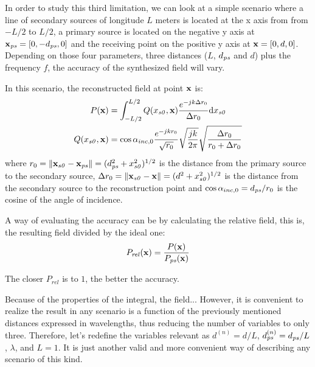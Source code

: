 In order to study this third limitation, we can look at a simple scenario where a line of secondary sources of longitude $L$ meters is located at the x axis from from $-L/2$ to $L/2$, a primary source is located on the negative y axis at $\PosTheo[primarySource] = [0, -d_{\PosTheoSubInd[primarySource]}, 0]$ and the receiving point on the positive y axis at $\PosTheo = [0, d, 0]$. Depending on those four parameters, three distances ($L$, $d_{\PosTheoSubInd[primarySource]}$ and $d$) plus the frequency $f$, the accuracy of the synthesized field will vary.

In this scenario, the reconstructed field at point $\PosTheo$ is:
\begin{equation}
\begin{aligned}
P(\PosTheo) &= \int_{-L/2}^{L/2} Q(x_{\PosTheoSubInd[section]}, \PosTheo) \frac{e^{-jk\distLinePoint}}{\distLinePoint} \mathrm{d}x_{\PosTheoSubInd[section]}\\
Q(x_{\PosTheoSubInd[section]}, \PosTheo) &= \cos\normPrimaryPropAngleSection \frac{e^{-jk\distLinePrimSource}}{\sqrt{\distLinePrimSource}} \sqrt{\frac{j k}{2\pi}} \sqrt{\frac{\distLinePoint}{\distLinePrimSource + \distLinePoint}}
\end{aligned}
\end{equation}
where $\distLinePrimSource = \norm{\PosTheo[section] - \PosTheo[primarySource]} = (d_{\PosTheoSubInd[primarySource]}^2 + x_{\PosTheoSubInd[section]}^2)^{1/2}$ is the distance from the primary source to the secondary source, $\distLinePoint = \norm{\PosTheo[section] - \PosTheo} = (d^2 + x_{\PosTheoSubInd[section]}^2)^{1/2}$ is the distance from the secondary source to the reconstruction point and $\cos\normPrimaryPropAngleSection = d_{\PosTheoSubInd[primarySource]}/\distLinePrimSource$ is the cosine of the angle of incidence.

A way of evaluating the accuracy can be by calculating the relative field, this is, the resulting field divided by the ideal one:
\begin{equation}
	P_\mathit{rel}(\PosTheo) = \frac{P(\PosTheo)}{P_{\PosTheoSubInd[primarySource]}(\PosTheo)}
\end{equation}

The closer $P_\mathit{rel}$ is to $1$, the better the accuracy.

Because of the properties of the integral, the field...
However, it is convenient to realize the result in any scenario is a function of the previously mentioned distances expressed in wavelengths, thus reducing the number of variables to only three. Therefore, let's redefine the variables relevant as $d^{(n)} = d/L$, $d_{\PosTheoSubInd[primarySource]}^{(n)} = d_{\PosTheoSubInd[primarySource]}/L$, $\lambda$, and $L=1$. It is just another valid and more convenient way of describing any scenario of this kind.

